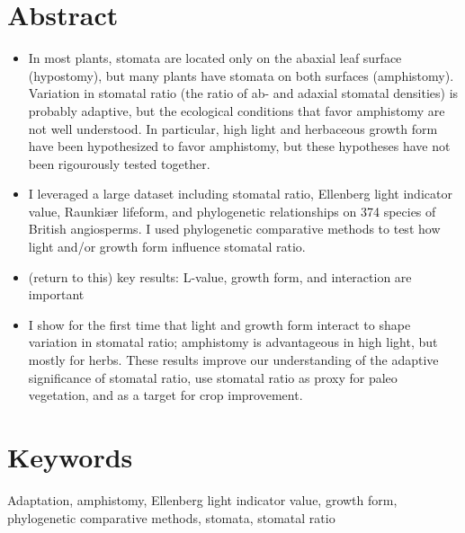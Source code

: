 \documentclass[12pt, oneside]{article}
\newcommand{\stretchy}{2}
\newcommand{\el}{L-value}
\begin{document}
\linenumbers
\setstretch{\stretchy}






\section*{Abstract}


\begin{itemize}
	\item In most plants, stomata are located only on the abaxial leaf surface (hypostomy), but many plants have stomata on both surfaces (amphistomy). Variation in stomatal ratio (the ratio of ab- and adaxial stomatal densities) is probably adaptive, but the ecological conditions that favor amphistomy are not well understood. In particular, high light and herbaceous growth form have been hypothesized to favor amphistomy, but these hypotheses have not been rigourously tested together.
	\item I leveraged a large dataset including stomatal ratio, Ellenberg light indicator value, Raunki\ae r lifeform, and phylogenetic relationships on 374 species of British angiosperms. I used phylogenetic comparative methods to test how light and/or growth form influence stomatal ratio.
	\item (return to this) key results: \el, growth form, and interaction are important
	\item I show for the first time that light and growth form interact to shape variation in stomatal ratio; amphistomy is advantageous in high light, but mostly for herbs. These results improve our understanding of the adaptive significance of stomatal ratio, use stomatal ratio as proxy for paleo vegetation, and as a target for crop improvement.
\end{itemize}


\section*{Keywords}

Adaptation, amphistomy, Ellenberg light indicator value, growth form, phylogenetic comparative methods, stomata, stomatal ratio
\end{document}
